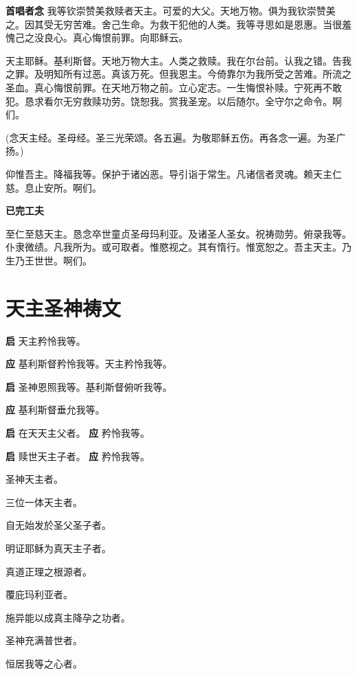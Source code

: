 \documentclass[UTF8,17pt]{ctexart}
\begin{document}
\textbf{⾸唱者念} \quad 我等钦崇赞美救赎者天主。可爱的⼤⽗。天地万物。俱为我钦崇赞美之。因其受⽆穷苦难。舍⼰⽣命。为救⼲犯他的⼈类。我等寻思如是恩惠。当很羞愧己之没良⼼。真⼼悔恨前罪。向耶稣云。

天主耶稣。基利斯督。天地万物⼤主。⼈类之救赎。我在尔台前。认我之错。告我之罪。及明知所有过恶。真该万死。但我恩主。今倚靠尔为我所受之苦难。所流之圣⾎。真⼼悔恨前罪。在天地万物之前。⽴⼼定志。⼀⽣悔恨补赎。宁死再不敢犯。恳求看尔⽆穷救赎功劳。饶恕我。赏我圣宠。以后随尔。全守尔之命令。啊们。

(念天主经。圣母经。圣三光荣颂。各五遍。为敬耶稣五伤。再各念⼀遍。为圣⼴扬。)

仰惟吾主。降福我等。保护于诸凶恶。导引诣于常⽣。凡诸信者灵魂。赖天主仁慈。息⽌安所。啊们。

\textbf{已完工夫}

⾄仁⾄慈天主。恳念卒世童贞圣母玛利亚。及诸圣⼈圣⼥。祝祷勋劳。俯录我等。仆⾪微绩。凡我所为。或可取者。惟愍视之。其有惰⾏。惟宽恕之。吾主天主。乃⽣乃王世世。啊们。

\section{天主圣神祷⽂}

\textbf{启} \quad 天主矜怜我等。

\textbf{应} \quad 基利斯督矜怜我等。天主矜怜我等。

\textbf{启} \quad 圣神恩照我等。基利斯督俯听我等。

\textbf{应} \quad 基利斯督垂允我等。

\textbf{启} \quad 在天天主⽗者。 \hfill \textbf{应} \quad 矜怜我等。

\textbf{启} \quad 赎世天主⼦者。 \hfill \textbf{应} \quad 矜怜我等。

 圣神天主者。

 三位⼀体天主者。

 ⾃⽆始发於圣⽗圣⼦者。

 明证耶稣为真天主⼦者。

 真道正理之根源者。

 覆庇玛利亚者。

 施异能以成真主降孕之功者。

 圣神充满普世者。

 恒居我等之⼼者。
\end{document}
